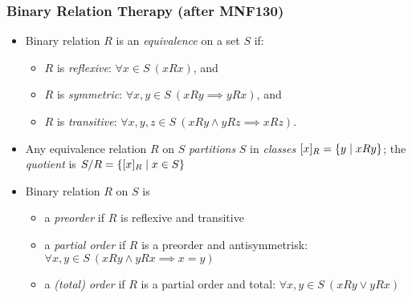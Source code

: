 \documentclass[handout]{beamer}
\begin{document}
\frame
  {
    
    \frametitle{Binary Relation Therapy (after MNF130)}\label{Ch2:BinRels}

 \begin{itemize}[<+->]\label{right-left-invariance}
    \item Binary relation $R$ is an \emph{equivalence} on a set $S$ if:
    \begin{itemize}[<+->]
    \item $R$ is \emph{reflexive}: $\forall x\in S~(xRx)$, and
    \item $R$ is \emph{symmetric}: $\forall x,y\in S~(xRy \implies yRx)$, and
    \item $R$ is \emph{transitive}: $\forall x,y,z\in S~(xRy \wedge yRz \implies xRz)$.
    \end{itemize}
    \item Any equivalence relation $R$ on $S$ \emph{partitions} $S$ 
    in \emph{classes} $[x]_R = \{y \mid xRy\}$; 
    the \emph{quotient} is $S/R = \{[x]_R \mid x\in S\}$
    \item Binary relation $R$ on $S$ is
    \begin{itemize}[<+->]
     \item a \emph{preorder} if $R$ is reflexive and transitive
     \item a \emph{partial order} if $R$ is a preorder and antisymmetrisk:
     $\forall x,y\in S~(xRy \wedge yRx \implies x=y)$
     \item a \emph{(total) order} if $R$ is a partial order and total:
     $\forall x,y\in S~(xRy \vee yRx)$
    \end{itemize}
 \end{itemize}

}
\end{document}
